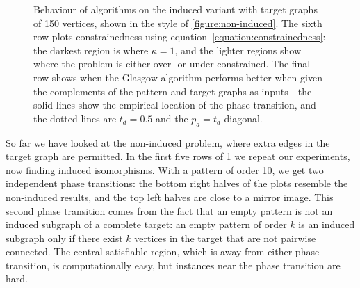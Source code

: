 \documentclass[twoside,11pt]{article}
\begin{document}
\begin{figure}[p]
    \caption{Behaviour of algorithms on the induced variant with target graphs of 150 vertices,
    shown in the style of \cref{figure:non-induced}. The sixth row plots constrainedness using
    equation~\eqref{equation:constrainedness}: the darkest region is where $\kappa = 1$, and the
    lighter regions show where the problem is either over- or under-constrained. The final row shows
    when the Glasgow algorithm performs better when given the complements of the pattern and target
    graphs as inputs---the solid lines show the empirical location of the phase transition, and the
    dotted lines are $t_d=0.5$ and the $p_d=t_d$ diagonal.}\label{figure:induced}
\end{figure}

So far we have looked at the non-induced problem, where extra edges in the target graph are
permitted.  In the first five rows of \cref{figure:induced} we repeat our experiments, now finding
induced isomorphisms. With a pattern of order 10, we get two independent phase transitions: the
bottom right halves of the plots resemble the non-induced results, and the top left halves are close
to a mirror image. This second phase transition comes from the fact that an empty pattern is not an
induced subgraph of a complete target: an empty pattern of order $k$ is an induced subgraph only if
there exist $k$ vertices in the target that are not pairwise connected.  The central satisfiable
region, which is away from either phase transition, is computationally easy, but instances near the
phase transition are hard.
\end{document}

